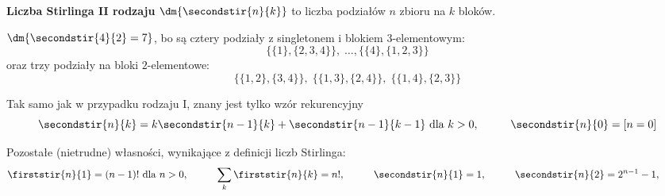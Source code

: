 \textbf{Liczba Stirlinga II rodzaju} $\dm{\secondstir{n}{k}}$ to liczba podziałów $n$ zbioru na $k$ bloków.

\begin{example}
$\dm{\secondstir{4}{2} = 7}$, bo są cztery podziały z singletonem i blokiem $3$-elementowym:
$$\big\{ \{1\}, \{2, 3, 4\} \big\}, \; \dots, \big\{ \{4\}, \{1, 2, 3\} \big\}$$
oraz trzy podziały na bloki $2$-elementowe:
$$\big\{ \{1, 2\}, \{3, 4\} \big\}, \; \big\{ \{1, 3\}, \{2, 4\} \big\}, \; \big\{ \{1, 4\}, \{2, 3\} \big\}$$
\end{example}

Tak samo jak w przypadku rodzaju I, znany jest tylko wzór rekurencyjny$$
\secondstir{n}{k} = k 
\secondstir{n - 1}{k} + \secondstir{n - 1}{k - 1}
\text{ dla $k > 0$}, \hspace{1cm} 
\secondstir{n}{0} = [n = 0]
$$

Pozostałe (nietrudne) własności, wynikające z definicji liczb Stirlinga: $$
\firststir{n}{1} = (n - 1)! \text{ dla $n > 0$}, \hspace{1cm}
\sum_{k} \firststir{n}{k} = n!, \hspace{1cm}
\secondstir{n}{1} = 1, \hspace{1cm}
\secondstir{n}{2} = 2^{n - 1} - 1, \hspace{1cm}
$$

